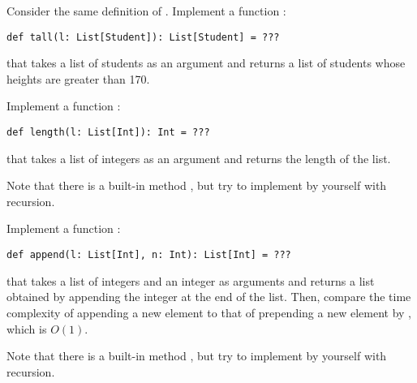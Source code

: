 \begin{exercise}

Consider the same definition of .
Implement a function :
\begin{verbatim}
def tall(l: List[Student]): List[Student] = ???
\end{verbatim}
that takes a list of students as an argument
and returns a list of students whose heights are greater than 170.

\end{exercise}

\begin{exercise}

Implement a function :
\begin{verbatim}
def length(l: List[Int]): Int = ???
\end{verbatim}
that takes a list of integers as an argument
and returns the length of the list.

Note that there is a built-in method , but try to implement
by yourself with recursion.

\end{exercise}

\begin{exercise}

Implement a function :
\begin{verbatim}
def append(l: List[Int], n: Int): List[Int] = ???
\end{verbatim}
that takes a list of integers and an integer as arguments
and returns a list obtained by appending the integer at the end of the list.
Then, compare the time complexity of appending a new element to that of
prepending a new element by \code{::}, which is $O(1)$.

Note that there is a built-in method , but try to implement
by yourself with recursion.

\end{exercise}
